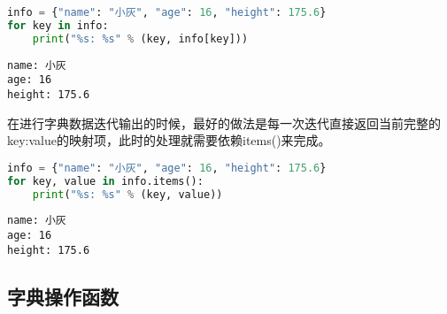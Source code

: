 
\begin{lstlisting}[language=Python]
info = {"name": "小灰", "age": 16, "height": 175.6}
for key in info:
    print("%s: %s" % (key, info[key]))
\end{lstlisting}

\begin{tcolorbox}
	\begin{verbatim}
name: 小灰
age: 16
height: 175.6
\end{verbatim}
\end{tcolorbox}

在进行字典数据迭代输出的时候，最好的做法是每一次迭代直接返回当前完整的key:value的映射项，此时的处理就需要依赖items()来完成。\\


\begin{lstlisting}[language=Python]
info = {"name": "小灰", "age": 16, "height": 175.6}
for key, value in info.items():
    print("%s: %s" % (key, value))
\end{lstlisting}

\begin{tcolorbox}
	\begin{verbatim}
name: 小灰
age: 16
height: 175.6
\end{verbatim}
\end{tcolorbox}

\vspace{0.5cm}

\subsection{字典操作函数}

\begin{table}[H]
	\centering
	\caption{字典操作函数}
\end{table}

